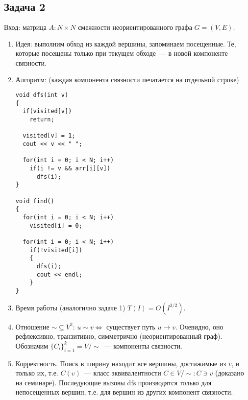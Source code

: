 \documentclass[a4paper]{article}
\begin{document}
\subsection*{Задача 2}
Вход: матрица $A\colon N\times N$ смежности неориентированного графа $G=(V,E)$.
\begin{enumerate}
\item Идея: выполним обход из каждой вершины, запоминаем посещенные. Те, которые посещены только при текущем обходе~--- в новой компоненте связности.
\item \href{https://bitbucket.org/etoestja/inf/raw/HEAD/mipt/s4/AACM/C/R2/main.cpp}{Алгоритм}: (каждая компонента связности печатается на отдельной строке)
\begin{lstlisting}
void dfs(int v)
{
  if(visited[v])
    return;

  visited[v] = 1;
  cout << v << " ";

  for(int i = 0; i < N; i++)
    if(i != v && arr[i][v])
      dfs(i);
}

void find()
{
  for(int i = 0; i < N; i++)
    visited[i] = 0;

  for(int i = 0; i < N; i++)
    if(!visited[i])
    {
      dfs(i);
      cout << endl;
    }
}
\end{lstlisting}
\item Время работы (аналогично задаче 1) $T(I)=O(I^{3/2})$.
\item Отношение $\sim\subseteq V^2$: $u\sim v\Leftrightarrow $ существует путь $u\to v$. Очевидно, оно рефлексивно, транзитивно, симметрично (неориентированный граф). Обозначим $\{C_i\}_{i=1}^k=V/\sim$~--- компоненты связности.
\item Корректность. Поиск в ширину находит все вершины, достижимые из $v$, и только их, т.е. $C(v)$~--- класс эквивалентности $C\in V/\sim\colon C\ni v$ (доказано на семинаре). Последующие вызовы $\mbox{dfs}$ производятся только для непосещенных вершин, т.е. для вершин из других компонент связности.
\end{enumerate}
\end{document}
